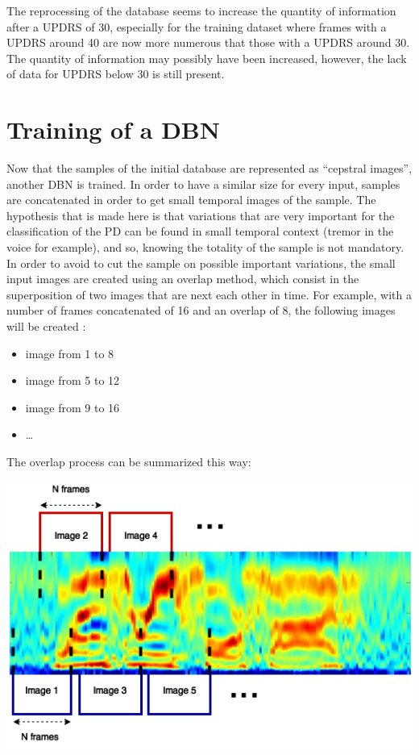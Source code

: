 \documentclass{report}
\begin{document}
	The reprocessing of the database seems to increase the quantity of information after a UPDRS of 30, especially for the training dataset where frames with a UPDRS around 40 are now more numerous that those with a UPDRS around 30. The quantity of information may possibly have been increased, however, the lack of data for UPDRS below 30 is still present.
	
	\section{Training of a DBN}
	
	Now that the samples of the initial database are represented as “cepstral images”, another DBN is trained. In order to have a similar size for every input, samples are concatenated in order to get small temporal images of the sample. The hypothesis that is made here is that variations that are very important for the classification of the PD can be found in small temporal context (tremor in the voice for example), and so, knowing the totality of the sample is not mandatory. In order to avoid to cut the sample on possible important variations, the small input images are created using an overlap method, which consist in the superposition of two images that are next each other in time. For example, with a number of frames concatenated of 16 and an overlap of 8, the following images will be created :
	\begin{itemize}
	\item image from 1 to 8
	\item image from 5 to 12
	\item image from 9 to 16
	\item …		
	\end{itemize}

	
	The overlap process can be summarized this way:
	
	\vspace{0.5cm}
	\begin{center}\label{fig:cepstral}
		\includegraphics[scale=0.65]{ressources/tr1}
	\end{center}
	\vspace{0.5cm}
	
\end{document}

